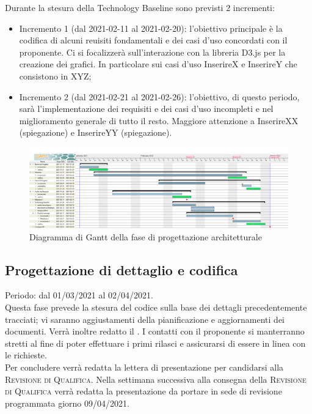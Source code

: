 \documentclass[../piano_di_progetto.tex]{subfiles}
\begin{document}
Durante la stesura della Technology Baseline sono previsti 2 incrementi:
\begin{itemize}
    \item Incremento 1 (dal 2021-02-11 al 2021-02-20): l'obiettivo principale è la codifica di alcuni reuisiti fondamentali e dei casi d'uso concordati con il proponente. Ci si focalizzerà sull'interazione con la libreria D3.js per la creazione dei grafici. In particolare sui casi d'uso InserireX e InserireY che consistono in XYZ;
\item Incremento 2 (dal 2021-02-21 al 2021-02-26): l'obiettivo, di questo periodo, sarà l'implementazione dei requisiti e dei casi d'uso incompleti e nel miglioramento generale di tutto il resto. Maggiore attenzione a InserireXX (spiegazione) e InserireYY (spiegazione).
\end{itemize}

\begin{figure}[H]
\centering
\includegraphics[width=18cm]{img/gantt/02_RP.png}
\caption{Diagramma di Gantt della fase di progettazione architetturale}
\end{figure}

\subsection{Progettazione di dettaglio e codifica}%
\label{sub:prog_dett}
Periodo: dal 01/03/2021 al 02/04/2021.\\
Questa fase prevede la stesura del codice sulla base dei dettagli precedentemente tracciati; vi saranno aggiustamenti della pianificazione e aggiornamenti dei documenti. Verrà inoltre redatto il \textsc{}. I contatti con il proponente si manterranno stretti al fine di poter effettuare i primi rilasci e assicurarsi di essere in linea con le richieste.\\
Per concludere verrà redatta la lettera di presentazione per candidarsi alla \textsc{Revisione di Qualifica}. Nella settimana successiva alla consegna della \textsc{Revisione di Qualifica} verrà redatta la presentazione da portare in sede di revisione programmata giorno 09/04/2021. 
\end{document}
